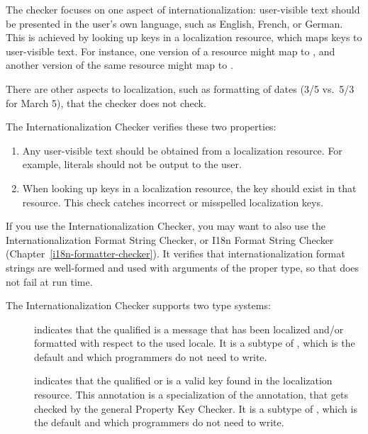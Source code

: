 The checker focuses on one aspect of internationalization:  user-visible text
should be presented in the user's own language, such as English, French, or
German.  This is achieved by looking up keys in a localization resource,
which maps keys to user-visible text.  For instance, one version of a
resource might map  to
, and another version of the same resource might map
 to .

There are other aspects to localization, such as formatting of dates (3/5
vs.~5/3 for March 5), that the checker does not check.

The Internationalization Checker verifies these two properties:

\begin{enumerate}

\item
  Any user-visible text should be obtained from a localization resource.
  For example,  literals should not be output to the user.

\item
  When looking up keys in a localization resource, the key should exist in
  that resource.  This check catches incorrect or misspelled localization
  keys.

\end{enumerate}

If you use the Internationalization Checker, you may want to also use the
Internationalization Format String Checker, or I18n Format String Checker
(Chapter~\ref{i18n-formatter-checker}).
It verifies that internationalization format strings are well-formed and
used with arguments of the proper type, so that
does not fail at run time.


The Internationalization Checker supports two type systems:

\begin{description}
\item[]
indicates that the qualified
 is a message that has been localized and/or formatted with
respect to the used locale.
It is a subtype of ,
which is the default and which programmers do not need to write.

\item[]
indicates that the
qualified  or  is a valid key found in the
localization resource.
This annotation is a specialization of the  annotation, that
gets checked by the general Property Key Checker.
It is a subtype of ,
which is the default and which programmers do not need to write.
\end{description}

